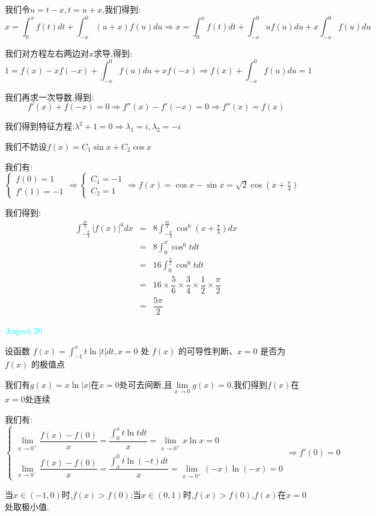 \begin{solution}

	我们令$u=t-x,t=u+x$,我们得到:
	$$x=\int_{0}^{x}f(t)dt+\int_{-x}^{0}(u+x)f(u)du\Rightarrow x=\int_{0}^{x}f(t)dt+\int_{-x}^{0}uf(u)du+x\int_{-x}^{0}f(u)du$$
	
	我们对方程左右两边对$x$求导,得到:
	$$1=f(x)-xf(-x)+\int_{-x}^{0}f(u)du+xf(-x)\Rightarrow f(x)+\int_{-x}^{0}f(u)du=1$$
	
	我们再求一次导数,得到:  
	$$f'(x)+f(-x)=0\Rightarrow f''(x)-f'(-x)=0\Rightarrow f''(x)=f(x)$$
	
	我们得到特征方程:$\lambda^2+1=0\Rightarrow \lambda_{1}=i,\lambda_{2}=-i$
	
	我们不妨设$f(x)=C_{1}\sin x+C_{2}\cos x$
	
	我们有:$\left\lbrace
	\begin{array}{l}
		f(0)=1\\
		f'(1)=-1
	\end{array}
	\right. \Rightarrow \left\lbrace
	\begin{array}{l}
		C_{1}=-1\\
		C_{2}=1
	\end{array}
	\right. \Rightarrow f(x)=\cos x-\sin x=\sqrt{2}\cos(x+\frac{\pi}{4})$
	
	我们得到:
	\begin{eqnarray*}
		\int_{-\frac{\pi}{4}}^{\frac{3\pi}{4}}|f(x)|^6dx&=&8\int_{-\frac{\pi}{4}}^{\frac{3\pi}{4}}\cos^6(x+\frac{\pi}{4})dx\\
		&=&8\int_{0}^{\pi}\cos^6 tdt\\
		&=&16\int_{0}^{\frac{\pi}{2}}\cos^6 tdt\\
		&=&16\times\dfrac{5}{6}\times\dfrac{3}{4}\times\dfrac{1}{2}\times\dfrac{\pi}{2}\\
		&=&\dfrac{5\pi}{2}
	\end{eqnarray*}
\end{solution}


\textcolor{cyan}{August 20}

\begin{example}[][Exam: 34.3.11]
	设函数 $f(x)=\int_{-1}^{x}t\ln|t|dt, x=0$ 处 $f(x)$ 的可导性判断、$x=0$ 是否为 $f(x)$ 的极值点
\end{example}

\begin{solution}

	我们有$g(x)=x\ln|x|$在$x=0$处可去间断,且$\lim\limits_{x\to 0}g(x)=0$,我们得到$f(x)$在$x=0$处连续
	
	我们有:
	$$\left\lbrace
	\begin{array}{l}
		\lim\limits_{x\to 0^{+}}\dfrac{f(x)-f(0)}{x}=\dfrac{\int_{0}^{x}t\ln tdt}{x}=\lim\limits_{x\to 0^{+}}x\ln x=0\\
		\lim\limits_{x\to 0^{-}}\dfrac{f(x)-f(0)}{x}=\dfrac{\int_{x}^{0}t\ln(-t)dt}{x}=\lim\limits_{x\to 0^{+}}(-x)\ln(-x)=0
	\end{array}
	\right. \Rightarrow f'(0)=0$$
	
	当$x\in(-1,0)$时,$f(x)>f(0)$;当$x\in(0,1)$时,$f(x)>f(0)$,$f(x)$在$x=0$处取极小值.
\end{solution}


